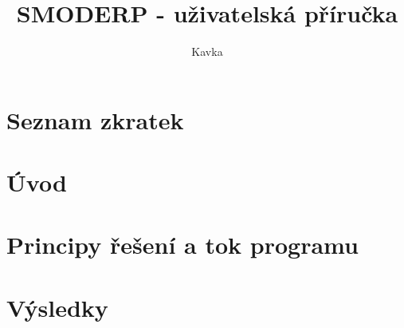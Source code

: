 \documentclass[a4paper, 11pt, twoside]{article}
\begin{document}
\title{SMODERP - uživatelská příručka}
\author{Kavka}


\clearpage\maketitle
\thispagestyle{empty}



\newpage
{}\setcounter{page}{1} %
\tableofcontents{}


\newpage
\section*{Seznam zkratek}
\begin{multicols}{2}

\end{multicols}



\newpage
{}\setcounter{page}{1}%
\section*{Úvod}


% 

\newpage
\section{Principy řešení a tok programu}


\newpage
\section{Výsledky}


\newpage

\end{document}
